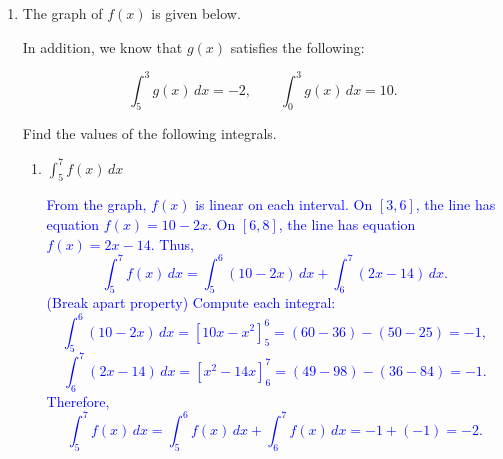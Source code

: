 \documentclass[11pt]{article}
\begin{document}
\begin{enumerate}
{In either case, that $p(x)$ has a single critical point which is a local minimum implies that $x=10$ minimizes $p(x)$ across the entire interval $(-\infty, \infty)$. Substituting back into our constraint we get $y=x-20 = -10$. We then conclude that the two numbers differing by 20 which have the smallest product are $10$ and $-10$, which have product $p=-100$.
}


\newpage

\item 

The graph of $f(x)$ is given below.

\begin{center}
\end{center}

In addition, we know that $g(x)$ satisfies the following:

\[
\int_5^3 g(x)\,dx = -2,
\qquad
\int_0^3 g(x)\,dx = 10.
\]

Find the values of the following integrals.

\begin{enumerate}

\item $\displaystyle \int_5^7 f(x)\,dx$

\vfill

\textcolor{blue}{
From the graph, $f(x)$ is linear on each interval.
On $[3,6]$, the line has equation $f(x)=10-2x$.
On $[6,8]$, the line has equation $f(x)=2x-14$.
Thus,
\[
\int_5^7 f(x)\,dx
=
\int_5^6 (10-2x)\,dx
+
\int_6^7 (2x-14)\,dx.
\]
(Break apart property)
Compute each integral:
\[
\int_5^6 (10-2x)\,dx
=
[10x-x^2]_5^6
=
(60-36)-(50-25)
=
-1,
\]
\[
\int_6^7 (2x-14)\,dx
=
[x^2-14x]_6^7
=
(49-98)-(36-84)
=
-1.
\]
Therefore,
\[
\int_5^7 f(x)\,dx = \int_5^6 f(x)\,dx + \int_6^7 f(x)\,dx = -1 + (-1) = -2.
\]
}


\end{enumerate}
\end{enumerate}
\end{document}
